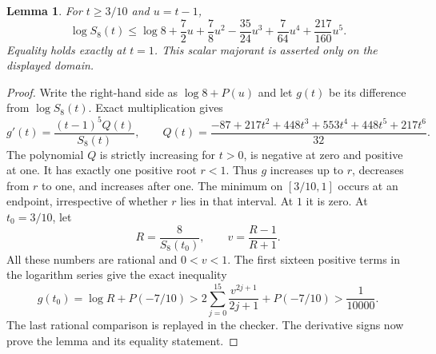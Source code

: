 \documentclass[11pt]{article}
\newtheorem{lemma}[theorem]{Lemma}
\theoremstyle{remark}
\numberwithin{equation}{section}
\begin{document}
\begin{lemma}\label{lem:noorigin-oct8-eight-quintic-scalar}
For $t\ge3/10$ and $u=t-1$,
\[
 \log S_8(t)\le\log8+\frac72u+\frac78u^2-\frac{35}{24}u^3
                          +\frac7{64}u^4+\frac{217}{160}u^5.
\]
Equality holds exactly at $t=1$. This scalar majorant is asserted
only on the displayed domain.
\end{lemma}
\begin{proof}
Write the right-hand side as $\log8+P(u)$ and let $g(t)$ be
its difference from $\log S_8(t)$. Exact multiplication gives
\[
 g'(t)=\frac{(t-1)^5Q(t)}{S_8(t)},\qquad
 Q(t)=\frac{-87+217t^2+448t^3+553t^4+448t^5+217t^6}{32}.
\]
The polynomial $Q$ is strictly increasing for $t>0$, is negative
at zero and positive at one. It has exactly one positive root
$r<1$. Thus $g$ increases up to $r$, decreases from $r$ to one,
and increases after one. The minimum on $[3/10,1]$ occurs at an
endpoint, irrespective of whether $r$ lies in that interval.
At $1$ it is zero. At $t_0=3/10$, let
\[
 R=\frac8{S_8(t_0)},\qquad v=\frac{R-1}{R+1}.
\]
All these numbers are rational and $0<v<1$. The first sixteen
positive terms in the logarithm series give the exact inequality
\[
 g(t_0)=\log R+P(-7/10)
 >2\sum_{j=0}^{15}\frac{v^{2j+1}}{2j+1}+P(-7/10)
 >\frac1{10000}.
\]
The last rational comparison is replayed in the checker.
The derivative signs now prove the lemma and its equality statement.
\end{proof}
\end{document}
